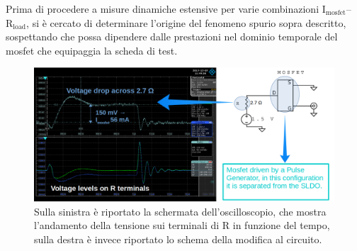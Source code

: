 Prima di procedere a misure dinamiche estensive per varie combinazioni $\mathrm{I_{mosfet}}$--$\mathrm{R_{load}}$, si è cercato di determinare l'origine del fenomeno spurio sopra descritto, sospettando che possa dipendere dalle prestazioni nel dominio temporale del mosfet che equipaggia la scheda di test.


\begin{figure}
\centering
\includegraphics[width=\linewidth]{Immagini/MosfetBehaviourbis}
\caption{Sulla sinistra è riportato la schermata dell'oscilloscopio, che mostra l'andamento della tensione sui terminali di R in funzione del tempo, sulla destra è invece riportato lo schema della modifica al circuito.}
\label{MosfetBehaviour}
\end{figure}

